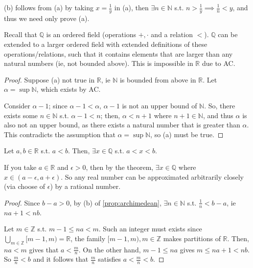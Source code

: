 \documentclass[12pt]{article}
\begin{document}
\begin{remark}
  (b) follows from (a) by taking $x = \frac{1}{y}$ in (a), then $\exists n\in \mathbb{N}$ s.t. $n > \frac{1}{y} \implies \frac{1}{n} < y$, and thus we need only prove (a).
\end{remark}

\begin{remark}
  Recall that $\mathbb{Q}$ is an ordered field (operations $+, \cdot$ and a relation $<$). $\mathbb{Q}$ can be extended to a larger ordered field with extended definitions of these operations/relations, such that it contains elements that are larger than any natural numbers (ie, not bounded above). This is impossible in $\mathbb{R}$ due to AC.
\end{remark}

\begin{proof}
   Suppose (a) not true in $\mathbb{R}$, ie $\mathbb{N}$ is bounded from above in $\mathbb{R}$. Let $\alpha = \sup \mathbb{N}$, which exists by AC.

   Consider $\alpha - 1$; since $\alpha - 1 < \alpha$, $\alpha - 1$ is not an upper bound of $\mathbb{N}$. So, there exists some $n \in \mathbb{N}$ s.t. $\alpha - 1 < n$; then, $\alpha < n+ 1$ where $n+1 \in \mathbb{N}$, and thus $\alpha$ is also not an upper bound, as there exists a natural number that is greater than $\alpha$. This contradicts the assumption that $\alpha = \sup \mathbb{N}$, so (a) must be true.
\end{proof}

\begin{theorem}[Density]
  Let $a,b \in \mathbb{R}$ s.t. $a < b$. Then, $\exists x \in \mathbb{Q}$ s.t. $a < x < b$.
\end{theorem}

\begin{remark}
  If you take $a \in \mathbb{R}$ and $\epsilon > 0$, then by the theorem, $\exists x \in \mathbb{Q}$ where $x \in (a - \epsilon, a + \epsilon)$. So any real number can be approximated arbitrarily closely (via choose of $\epsilon$) by a rational number.
\end{remark}

\begin{proof}
  Since $b - a > 0$, by (b) of \cref{prop:archimedean}, $\exists n \in \mathbb{N}$ s.t. $\frac{1}{n} < b -a$, ie $na + 1 < nb$.

  Let $m \in \mathbb{Z}$ s.t. $m - 1 \leq na < m$. Such an integer must exists since $\bigcup_{m \in \mathbb{Z}} [m-1, m) = \mathbb{R}$, the family $[m-1,m), m \in \mathbb{Z}$ makes partitions of $\mathbb{R}$. Then, $na < m$ gives that $a < \frac{m}{n}$. On the other hand, $m -1 \leq na$ gives $m \leq na+1 < nb$. So $\frac{m}{n} < b$ and it follows that $\frac{m}{n}$ satisfies $a < \frac{m}{n} < b$.
\end{proof}
\end{document}
